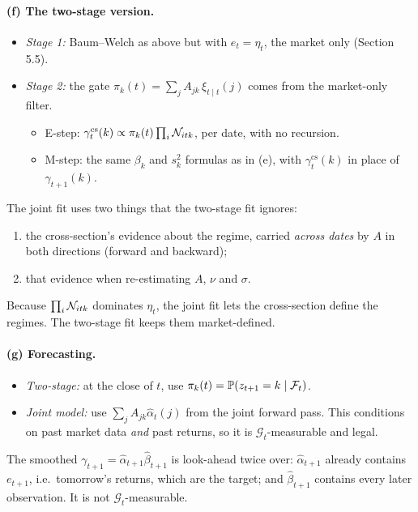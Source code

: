 \paragraph{(f) The two-stage version.}
\begin{itemize}
  \item \emph{Stage 1:} Baum--Welch as above but with $e_t=\eta_t$, the market only (Section 5.5).
  \item \emph{Stage 2:} the gate $\pi_k(t)=\sum_jA_{jk}\,\xi_{t\mid t}(j)$ comes from the market-only filter.
    \begin{itemize}
      \item E-step: $\gamma^{\text{cs}}_{t}(k)\propto\pi_k(t)\prod_i\mathcal{N}_{itk}$, per date, with no recursion.
      \item M-step: the same $\beta_k$ and $s_k^2$ formulas as in (e), with $\gamma^{\text{cs}}_t(k)$ in place of $\gamma_{t+1}(k)$.
    \end{itemize}
\end{itemize}
The joint fit uses two things that the two-stage fit ignores:
\begin{enumerate}
  \item the cross-section's evidence about the regime, carried \emph{across dates} by $A$ in both directions (forward and backward);
  \item that evidence when re-estimating $A$, $\nu$ and $\sigma$.
\end{enumerate}
Because $\prod_i\mathcal{N}_{itk}$ dominates $\eta_t$, the joint fit lets the cross-section define the regimes. The two-stage fit keeps them market-defined.

\paragraph{(g) Forecasting.}
\begin{itemize}
  \item \emph{Two-stage:} at the close of $t$, use $\pi_k(t)=\mathbb P(z_{t+1}=k\mid\mathcal{F}_t)$.
  \item \emph{Joint model:} use $\sum_jA_{jk}\hat\alpha_t(j)$ from the joint forward pass. This conditions on past market data \emph{and} past returns, so it is $\mathcal G_t$-measurable and legal.
\end{itemize}
The smoothed $\gamma_{t+1}=\hat\alpha_{t+1}\hat\beta_{t+1}$ is look-ahead twice over: $\hat\alpha_{t+1}$ already contains $e_{t+1}$, i.e.\ tomorrow's returns, which are the target; and $\hat\beta_{t+1}$ contains every later observation. It is not $\mathcal G_t$-measurable.

